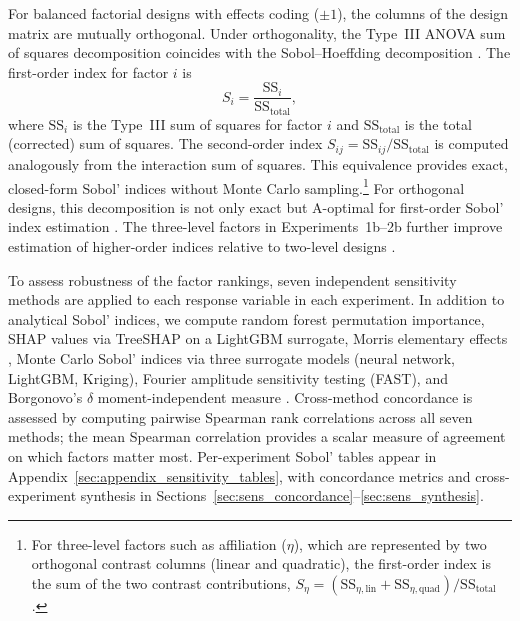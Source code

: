 For balanced factorial designs with effects coding ($\pm 1$), the columns of the design matrix are mutually orthogonal. Under orthogonality, the Type~III ANOVA sum of squares decomposition coincides with the Sobol--Hoeffding decomposition \citep{ArcherSaltelliSobol1997, Saltelli2008}. The first-order index for factor $i$ is
\begin{equation}
S_i = \frac{\mathrm{SS}_i}{\mathrm{SS}_{\mathrm{total}}},
\end{equation}
where $\mathrm{SS}_i$ is the Type~III sum of squares for factor $i$ and $\mathrm{SS}_{\mathrm{total}}$ is the total (corrected) sum of squares. The second-order index $S_{ij} = \mathrm{SS}_{ij} / \mathrm{SS}_{\mathrm{total}}$ is computed analogously from the interaction sum of squares. This equivalence provides exact, closed-form Sobol' indices without Monte Carlo sampling.\footnote{For three-level factors such as affiliation ($\eta$), which are represented by two orthogonal contrast columns (linear and quadratic), the first-order index is the sum of the two contrast contributions, $S_\eta = (\mathrm{SS}_{\eta,\mathrm{lin}} + \mathrm{SS}_{\eta,\mathrm{quad}}) / \mathrm{SS}_{\mathrm{total}}$.} For orthogonal designs, this decomposition is not only exact but A-optimal for first-order Sobol' index estimation \citep{MorrisMooreMcKay2008}. The three-level factors in Experiments~1b--2b further improve estimation of higher-order indices relative to two-level designs \citep{WangTangZhang2012}.

\label{sec:power_analysis}

To assess robustness of the factor rankings, seven independent sensitivity methods are applied to each response variable in each experiment. In addition to analytical Sobol' indices, we compute random forest permutation importance, SHAP values via TreeSHAP on a LightGBM surrogate, Morris elementary effects \citep{Morris1991}, Monte Carlo Sobol' indices via three surrogate models (neural network, LightGBM, Kriging), Fourier amplitude sensitivity testing (FAST), and Borgonovo's $\delta$ moment-independent measure \citep{Borgonovo2007}. Cross-method concordance is assessed by computing pairwise Spearman rank correlations across all seven methods; the mean Spearman correlation provides a scalar measure of agreement on which factors matter most. Per-experiment Sobol' tables appear in Appendix~\ref{sec:appendix_sensitivity_tables}, with concordance metrics and cross-experiment synthesis in Sections~\ref{sec:sens_concordance}--\ref{sec:sens_synthesis}.
